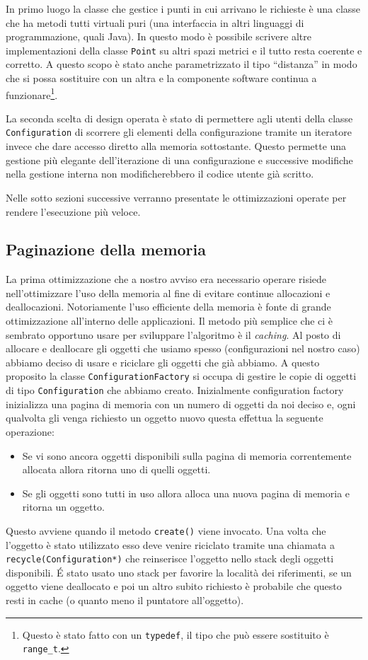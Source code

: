 \documentclass[a4paper, 10pt]{article}
\begin{document}
In primo luogo la classe che gestice i punti in cui arrivano le 
richieste è una classe che ha metodi tutti virtuali puri (una interfaccia 
in altri linguaggi di programmazione, quali Java). In questo modo è possibile
scrivere altre implementazioni della classe \texttt{Point} su altri spazi 
metrici e il tutto resta coerente e corretto. A questo scopo è stato anche 
parametrizzato il tipo ``distanza'' in modo che si possa sostituire con un 
altra e la componente software continua a funzionare\footnote{Questo è stato 
fatto con un \texttt{typedef}, il tipo che può essere sostituito è 
\texttt{range\_t}.}.

La seconda scelta di design operata è stato di permettere agli utenti della 
classe \texttt{Configuration} di scorrere gli elementi della configurazione
tramite un iteratore invece che dare accesso diretto alla memoria sottostante.
Questo permette una gestione più elegante dell'iterazione di una configurazione
e successive modifiche nella gestione interna non modificherebbero il codice
utente già scritto. 

Nelle sotto sezioni successive verranno presentate le ottimizzazioni operate
per rendere l'esecuzione più veloce. 

\subsection{Paginazione della memoria}
La prima ottimizzazione che a nostro avviso era necessario operare risiede 
nell'ottimizzare l'uso della memoria al fine di evitare continue allocazioni e
deallocazioni. Notoriamente l'uso efficiente della memoria è fonte di grande
ottimizzazione all'interno delle applicazioni. Il metodo più semplice che 
ci è sembrato opportuno usare per sviluppare l'algoritmo è il \emph{caching}.
Al posto di allocare e deallocare gli oggetti che usiamo spesso (configurazioni
nel nostro caso) abbiamo deciso di usare e riciclare gli oggetti che già abbiamo.
A questo proposito la classe \texttt{ConfigurationFactory} si occupa di gestire
le copie di oggetti di tipo \texttt{Configuration} che abbiamo creato. 
Inizialmente configuration factory inizializza una pagina di memoria con 
un numero di oggetti da noi deciso e, ogni qualvolta gli venga richiesto un 
oggetto nuovo questa effettua la seguente operazione:
\begin{itemize}
  \item Se vi sono ancora oggetti disponibili sulla pagina di memoria correntemente
  allocata allora ritorna uno di quelli oggetti.
  \item Se gli oggetti sono tutti in uso allora alloca una nuova pagina di 
  memoria e ritorna un oggetto.
\end{itemize}
Questo avviene quando il metodo \texttt{create()} viene invocato. Una volta 
che l'oggetto è stato utilizzato esso deve venire riciclato tramite una 
chiamata a \texttt{recycle(Configuration*)} che reinserisce l'oggetto nello 
stack degli oggetti disponibili. \'E stato usato uno stack per favorire la 
località dei riferimenti, se un oggetto viene deallocato e poi un altro 
subito richiesto è probabile che questo resti in cache (o quanto meno il 
puntatore all'oggetto).
\end{document}

